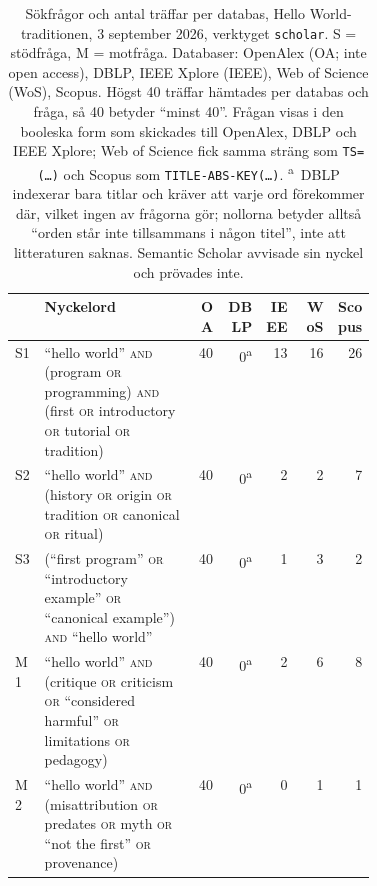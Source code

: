 \begin{table}[!htb]
  \caption{Sökfrågor och antal träffar per databas, Hello
    World-traditionen, 3 september 2026, verktyget \texttt{scholar}.
    S = stödfråga, M = motfråga.  Databaser: OpenAlex (OA; inte
    \foreignlanguage{english}{open access}), DBLP, IEEE Xplore (IEEE),
    Web of Science (WoS), Scopus.  Högst 40 träffar hämtades per databas
    och fråga, så 40 betyder \enquote{minst 40}.  Frågan visas i den
    booleska form som skickades till OpenAlex, DBLP och IEEE Xplore; Web
    of Science fick samma sträng som \texttt{TS=(\dots)} och Scopus som
    \texttt{TITLE-ABS-KEY(\dots)}.  \textsuperscript{a}~DBLP indexerar
    bara titlar och kräver att varje ord förekommer där, vilket ingen av
    frågorna gör; nollorna betyder alltså \enquote{orden står inte
    tillsammans i någon titel}, inte att litteraturen saknas.
    Semantic Scholar avvisade sin nyckel och prövades inte.}%
  \label{tab:sok-queries-hw}
    \centering\footnotesize
    \begin{tabular}{@{}lp{0.42\linewidth}rrrrr@{}}
      \toprule
      & Nyckelord & OA & DBLP & IEEE & WoS & Scopus \\
      \midrule
      S1 & \enquote{hello world} \textsc{and} (program \textsc{or}
           programming) \textsc{and} (first \textsc{or} introductory
           \textsc{or} tutorial \textsc{or} tradition)
         & 40 & 0\textsuperscript{a} & 13 & 16 & 26 \\
      S2 & \enquote{hello world} \textsc{and} (history \textsc{or} origin
           \textsc{or} tradition \textsc{or} canonical \textsc{or} ritual)
         & 40 & 0\textsuperscript{a} & 2 & 2 & 7 \\
      S3 & (\enquote{first program} \textsc{or} \enquote{introductory
           example} \textsc{or} \enquote{canonical example}) \textsc{and}
           \enquote{hello world}
         & 40 & 0\textsuperscript{a} & 1 & 3 & 2 \\
      \midrule
      M1 & \enquote{hello world} \textsc{and} (critique \textsc{or}
           criticism \textsc{or} \enquote{considered harmful} \textsc{or}
           limitations \textsc{or} pedagogy)
         & 40 & 0\textsuperscript{a} & 2 & 6 & 8 \\
      M2 & \enquote{hello world} \textsc{and} (misattribution \textsc{or}
           predates \textsc{or} myth \textsc{or} \enquote{not the first}
           \textsc{or} provenance)
         & 40 & 0\textsuperscript{a} & 0 & 1 & 1 \\
      \bottomrule
    \end{tabular}
\end{table}

